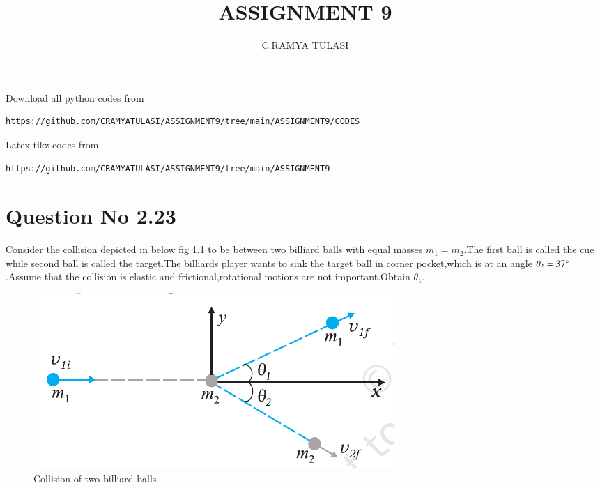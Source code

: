\documentclass[journal,12pt,twocolumn]{IEEEtran}
\begin{document}
     \def\rightbox#1{\makebox[0in][r]{#1}}
     \def\centbox#1{\makebox[0in]{#1}}
     \def\topbox#1{\raisebox{-\baselineskip}[0in][0in]{#1}}
     \def\midbox#1{\raisebox{-0.5\baselineskip}[0in][0in]{#1}}
\vspace{3cm}
\title{ASSIGNMENT 9}
\author{C.RAMYA TULASI}
\maketitle
\newpage
\bigskip
\renewcommand{\thefigure}{\theenumi}
\renewcommand{\thetable}{\theenumi}
Download all python codes from 
\begin{lstlisting}
https://github.com/CRAMYATULASI/ASSIGNMENT9/tree/main/ASSIGNMENT9/CODES
\end{lstlisting}
%
Latex-tikz codes from 
%
\begin{lstlisting}
https://github.com/CRAMYATULASI/ASSIGNMENT9/tree/main/ASSIGNMENT9
\end{lstlisting}
%
\section{Question No 2.23}
Consider the collision depicted in below fig 1.1 to be between  two billiard balls with equal masses
$m_1=m_2$.The first ball is called the cue while second ball is called the target.The billiards player wants to sink the target ball in corner pocket,which is at an angle $\theta_2=37\degree$.Assume that the collision is elastic and frictional,rotational motions are not important.Obtain $\theta_1$.
\begin{figure}[!ht]
    \centering
    \includegraphics[width=\columnwidth]{6.10.png}
    \caption{Collision of two billiard balls}
    \label{fig:.1.1.}
\end{figure}  
\end{document}
